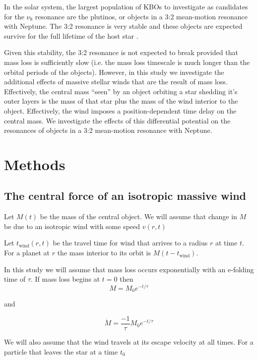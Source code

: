 \documentclass[twocolumn]{aastex631}
\begin{document}
In the solar system, the largest population of KBOs to investigate as
candidates for the $\nu_8$ resonance are the plutinos, or objects in
a 3:2 mean-motion resonance with Neptune. The 3:2 resonance is very stable
and these objects are expected survive for the full
lifetime of the host star \citep{nesvorny2000}.

Given this stability, the 3:2 resonance is not expected to
break provided that mass loss is sufficiently slow (i.e. the
mass loss timescale is much longer than the orbital periods of
the objects). However, in this study we investigate the additional
effects of massive stellar winds that are the result of mass loss.
Effectively, the central mass ``seen'' by an object orbiting a star
shedding it's outer layers is the mass of that star plus the mass of the
wind interior to the object. Effectively, the wind imposes a
position-dependent time delay on the central mass. We investigate
the effects of this differential potential on the resonances of
objects in a 3:2 mean-motion resonance with Neptune.


\section{Methods}
\label{sec:methods}

\subsection{The central force of an isotropic massive wind}

Let $M(t)$ be the mass of the central object. We will assume
that change in $M$ be due to an isotropic wind with some speed
$v(r,t)$

Let $t_{\text{wind}}(r,t)$ be the travel time for wind that arrives to
a radius $r$ at time $t$. For a planet at $r$ the mass interior
to its orbit is $M(t-t_{\text{wind}})$.

In this study we will assume that mass loss occurs exponentially
with an e-folding time of $\tau$. If mass loss begins at $t=0$
then
\begin{equation}
    M = M_0 e^{-t/\tau} \label{eq:m}
\end{equation}

and 

\begin{equation}
    \dot{M} = \frac{-1}{\tau} M_0 e^{-t/\tau} \label{eq:mdot}
\end{equation}

We will also assume that the wind travels at its escape velocity
at all times. For a particle that leaves the star at a time
$t_0$
\end{document}
